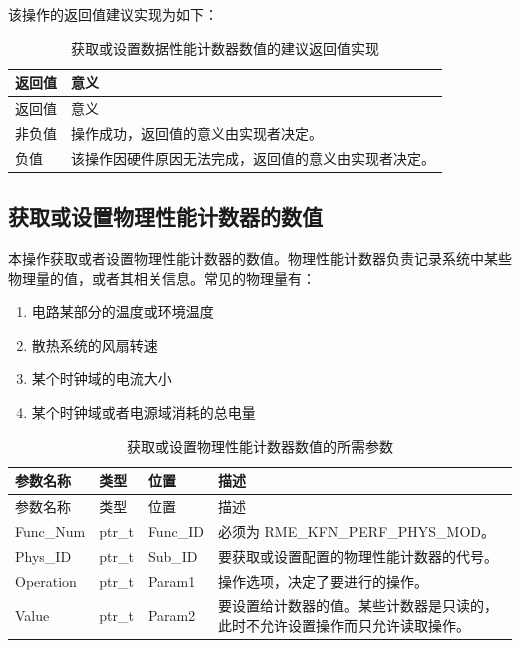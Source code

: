 该操作的返回值建议实现为如下：

\begin{xltabular}{\textwidth}{@{}>{\hsize\raggedright\arraybackslash}X>{\hsize\raggedright\arraybackslash}X@{}}
\caption{获取或设置数据性能计数器数值的建议返回值实现}\label{tab:8-67-get-or-set-data-performance-counter-suggested-return-values}\\
\toprule
返回值 & 意义\tabularnewline
\endfirsthead
\toprule
返回值 & 意义\tabularnewline
\midrule
\endhead
\bottomrule
\endlastfoot
    非负值 & 操作成功，返回值的意义由实现者决定。\tabularnewline
    负值 & 该操作因硬件原因无法完成，返回值的意义由实现者决定。\tabularnewline
\end{xltabular}

\subsection{获取或设置物理性能计数器的数值}\label{subsec:8-get-or-set-physical-performance-counter}

本操作获取或者设置物理性能计数器的数值。物理性能计数器负责记录系统中某些物理量的值，或者其相关信息。常见的物理量有：

\begin{enumerate}
\def\labelenumi{\arabic{enumi}.}
\item
  电路某部分的温度或环境温度
\item
  散热系统的风扇转速
\item
  某个时钟域的电流大小
\item
  某个时钟域或者电源域消耗的总电量
\end{enumerate}

\begin{xltabular}{\textwidth}{@{}>{\hsize\raggedright\arraybackslash}X>{\hsize\raggedright\arraybackslash}X>{\hsize\raggedright\arraybackslash}X>{\hsize\raggedright\arraybackslash}X@{}}
\caption{获取或设置物理性能计数器数值的所需参数}\label{tab:8-68-get-or-set-physical-performance-counter-parameters}\\
\toprule
参数名称 & 类型 & 位置 & 描述\tabularnewline
\endfirsthead
\toprule
参数名称 & 类型 & 位置 & 描述\tabularnewline
\midrule
\endhead
\bottomrule
\endlastfoot
Func\_Num & ptr\_t & Func\_ID & 必须为 RME\_KFN\_PERF\_PHYS\_MOD。\tabularnewline
Phys\_ID & ptr\_t & Sub\_ID &
要获取或设置配置的物理性能计数器的代号。\tabularnewline
Operation & ptr\_t & Param1 &
操作选项，决定了要进行的操作。\tabularnewline
Value & ptr\_t & Param2 &
要设置给计数器的值。某些计数器是只读的，此时不允许设置操作而只允许读取操作。\tabularnewline
\end{xltabular}


